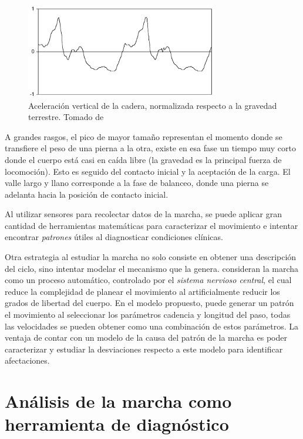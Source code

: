 \begin{figure}
    \centering
    \includegraphics[width = 0.75\textwidth]{imagenes/menz_acceleration}
    \caption{Aceleración vertical de la cadera, normalizada respecto a la gravedad terrestre. Tomado de \citep{menz}}
    \label{fig:menz_acc_ver}
\end{figure}

A grandes rasgos, el pico de mayor tamaño representan el momento donde se transfiere el peso de una pierna a la otra, existe en esa fase un tiempo muy corto donde el cuerpo está casi en caída libre (la gravedad es la principal fuerza de locomoción). Esto es seguido del contacto inicial y la aceptación de la carga. El valle largo y llano corresponde a la fase de balanceo, donde una pierna se adelanta hacia la posición de contacto inicial.

Al utilizar sensores para recolectar datos de la marcha, se puede aplicar gran cantidad de herramientas matemáticas para caracterizar el movimiento e intentar encontrar \emph{patrones} útiles al diagnosticar condiciones clínicas. 

Otra estrategia al estudiar la marcha no solo consiste en obtener una descripción del ciclo, sino intentar modelar el mecanismo que la genera. \cite{dejnabadi} consideran la marcha como un proceso automático, controlado por el \emph{sistema nervioso central}, el cual reduce la complejidad de planear el movimiento al artificialmente reducir los grados de libertad del cuerpo. En el modelo propuesto, puede generar un patrón el movimiento al seleccionar los parámetros cadencia y longitud del paso, todas las velocidades se pueden obtener como una combinación de estos parámetros. La ventaja de contar con un modelo de la causa del patrón de la marcha es poder caracterizar y estudiar la desviaciones respecto a este modelo para identificar afectaciones. 



\section[Herramienta de diagnóstico]{Análisis de la marcha como herramienta de diagnóstico}


